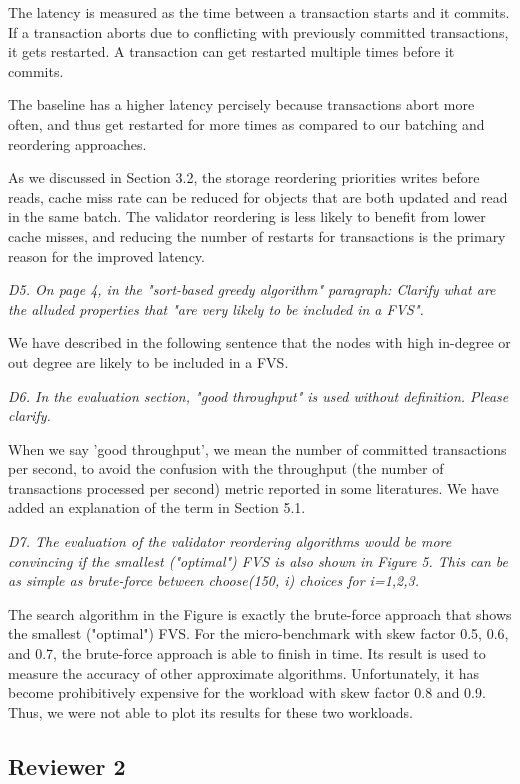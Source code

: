 \documentclass{article}
\begin{document}
The latency is measured as the time between a transaction starts and it commits. If a transaction aborts due to conflicting with previously committed transactions, it gets restarted. A transaction can get restarted multiple times before it commits. 

The baseline has a higher latency percisely because transactions abort more often, and thus get restarted for more times as compared to our batching and reordering approaches. 

As we discussed in Section 3.2, the storage reordering priorities writes before reads, cache miss rate can be reduced for objects that are both updated and read in the same batch. The validator reordering is less likely to benefit from lower cache misses, and reducing the number of restarts for transactions is the primary reason for the improved latency.

\emph{D5. On page 4, in the "sort-based greedy algorithm" paragraph: Clarify what are the alluded properties that "are very likely to be included in a FVS".}

We have described in the following sentence that the nodes with high in-degree or out degree are likely to be included in a FVS.

\emph{D6. In the evaluation section, "good throughput" is used without definition. Please clarify.}

When we say 'good throughput', we mean the number of committed transactions per second, to avoid the confusion with the throughput (the number of transactions processed per second) metric reported in some literatures. We have added an explanation of the term in Section 5.1.  

\emph{D7. The evaluation of the validator reordering algorithms would be more convincing if the smallest ("optimal") FVS is also shown in Figure 5. This can be as simple as brute-force between choose(150, i) choices for i=1,2,3.}

The search algorithm in the Figure is exactly the brute-force approach that shows the smallest ("optimal") FVS. For the micro-benchmark with skew factor 0.5, 0.6, and 0.7, the brute-force approach is able to finish in time. Its result is used to measure the accuracy of other approximate algorithms. Unfortunately, it has become prohibitively expensive for the workload with skew factor 0.8 and 0.9. Thus, we were not able to plot its results for these two workloads.

\subsection{Reviewer 2}
\end{document}
